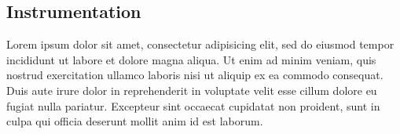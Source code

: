 \subsection{Instrumentation}

Lorem ipsum dolor sit amet, consectetur adipisicing elit, sed do eiusmod tempor incididunt ut labore et dolore magna aliqua. Ut enim ad minim veniam, quis nostrud exercitation ullamco laboris nisi ut aliquip ex ea commodo consequat. Duis aute irure dolor in reprehenderit in voluptate velit esse cillum dolore eu fugiat nulla pariatur. Excepteur sint occaecat cupidatat non proident, sunt in culpa qui officia deserunt mollit anim id est laborum.
